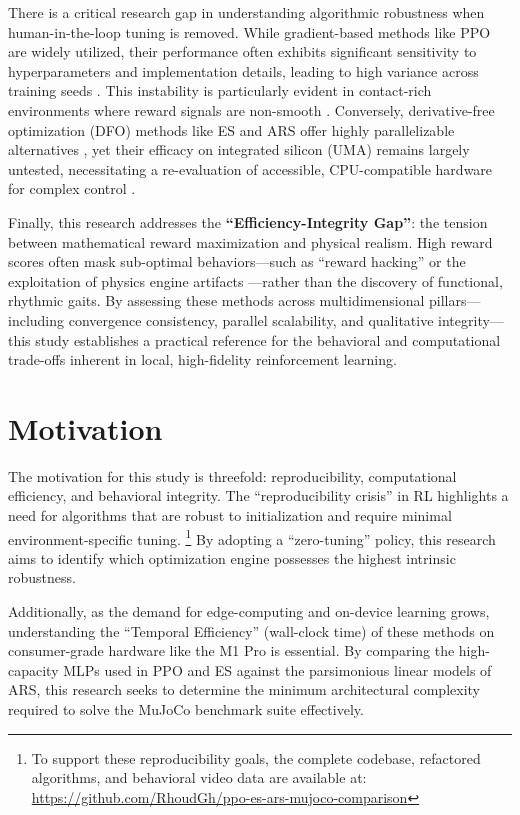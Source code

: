 There is a critical research gap in understanding algorithmic robustness when human-in-the-loop tuning is removed. While gradient-based methods like PPO are widely utilized, their performance often exhibits significant sensitivity to hyperparameters and implementation details, leading to high variance across training seeds \citep{engstrom2020ppo, andrychowicz2021what}. This instability is particularly evident in contact-rich environments where reward signals are non-smooth \citep{shahid2022manipulation}. Conversely, derivative-free optimization (DFO) methods like ES and ARS offer highly parallelizable alternatives \citep{salimans2017es, pagliuca2020efficacy}, yet their efficacy on integrated silicon (UMA) remains largely untested, necessitating a re-evaluation of accessible, CPU-compatible hardware for complex control \citep{such2017deep}.

Finally, this research addresses the \textbf{“Efficiency-Integrity Gap”}: the tension between mathematical reward maximization and physical realism. High reward scores often mask sub-optimal behaviors—such as “reward hacking” or the exploitation of physics engine artifacts \citep{todorov2012mujoco}—rather than the discovery of functional, rhythmic gaits. By assessing these methods across multidimensional pillars—including convergence consistency, parallel scalability, and qualitative integrity—this study establishes a practical reference for the behavioral and computational trade-offs inherent in local, high-fidelity reinforcement learning.
\section{Motivation}

The motivation for this study is threefold: reproducibility, computational efficiency, and behavioral integrity. The ``reproducibility crisis'' in RL highlights a need for algorithms that are robust to initialization and require minimal environment-specific tuning. \footnote{To support these reproducibility goals, the complete codebase, refactored algorithms, and behavioral video data are available at: \url{https://github.com/RhoudGh/ppo-es-ars-mujoco-comparison}} By adopting a ``zero-tuning'' policy, this research aims to identify which optimization engine possesses the highest intrinsic robustness.

Additionally, as the demand for edge-computing and on-device learning grows, understanding the ``Temporal Efficiency'' (wall-clock time) of these methods on consumer-grade hardware like the M1 Pro is essential. By comparing the high-capacity MLPs used in PPO and ES against the parsimonious linear models of ARS, this research seeks to determine the minimum architectural complexity required to solve the MuJoCo benchmark suite effectively.

